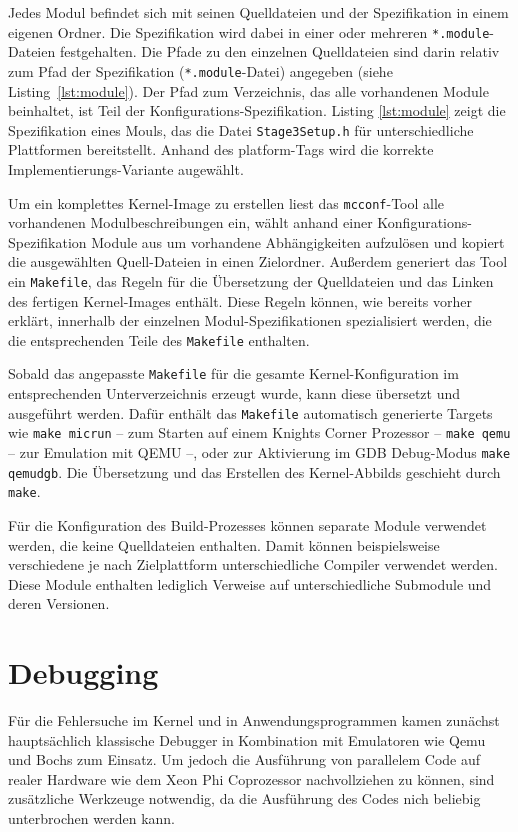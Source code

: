 Jedes Modul befindet sich mit seinen Quelldateien und der Spezifikation in einem
eigenen Ordner. Die Spezifikation wird dabei in einer oder mehreren
\texttt{*.module}-Dateien festgehalten. Die Pfade zu den einzelnen Quelldateien
sind darin relativ zum Pfad der Spezifikation (\texttt{*.module}-Datei)
angegeben (siehe Listing~\ref{lst:module}). Der Pfad zum Verzeichnis, das alle
vorhandenen Module beinhaltet, ist Teil der Konfigurations-Spezifikation.
Listing \ref{lst:module} zeigt die Spezifikation eines Mouls, das die Datei
\texttt{Stage3Setup.h} für unterschiedliche Plattformen bereitstellt. Anhand des
platform-Tags wird die korrekte Implementierungs-Variante augewählt.

Um ein komplettes Kernel-Image zu erstellen liest das \texttt{mcconf}-Tool alle
vorhandenen Modulbeschreibungen ein, wählt anhand einer
Konfigurations-Spezifikation Module aus um vorhandene Abhängigkeiten aufzulösen
und kopiert die ausgewählten Quell-Dateien in einen Zielordner.
Außerdem generiert das Tool ein \texttt{Makefile}, das Regeln für die
Übersetzung der Quelldateien und das Linken des fertigen Kernel-Images enthält.
Diese Regeln können, wie bereits vorher erklärt, innerhalb der einzelnen
Modul-Spezifikationen spezialisiert werden, die die entsprechenden Teile des
\texttt{Makefile} enthalten.

Sobald das angepasste \texttt{Makefile} für die gesamte Kernel-Konfiguration im
entsprechenden Unterverzeichnis erzeugt wurde, kann diese übersetzt und
ausgeführt werden. Dafür enthält das \texttt{Makefile} automatisch generierte
Targets wie \texttt{make micrun} -- zum Starten auf einem Knights Corner
Prozessor -- \texttt{make qemu} -- zur Emulation mit QEMU --, oder zur
Aktivierung im GDB Debug-Modus \texttt{make qemudgb}. Die Übersetzung und das
Erstellen des Kernel-Abbilds geschieht durch \texttt{make}. 

Für die Konfiguration des Build-Prozesses können separate Module verwendet
werden, die keine Quelldateien enthalten. Damit können beispielsweise
verschiedene je nach Zielplattform  unterschiedliche Compiler verwendet werden.
Diese Module enthalten lediglich Verweise auf unterschiedliche
Submodule  und deren Versionen. 

\section{Debugging}
Für die Fehlersuche im Kernel und in Anwendungsprogrammen kamen zunächst
hauptsächlich klassische Debugger in Kombination mit Emulatoren wie Qemu und
Bochs zum Einsatz. Um jedoch die Ausführung von parallelem Code auf realer
Hardware wie dem Xeon Phi Coprozessor nachvollziehen zu können, sind zusätzliche
Werkzeuge notwendig, da die Ausführung des Codes nich beliebig unterbrochen
werden kann.

